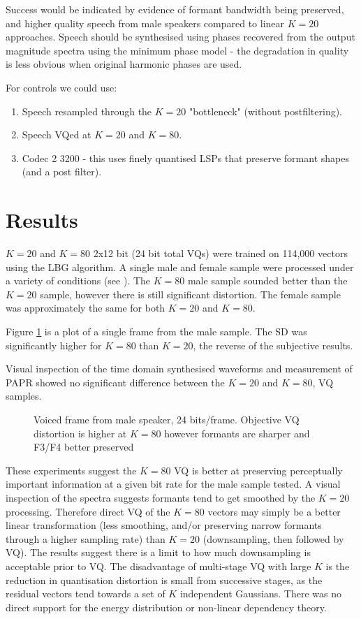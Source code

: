 \documentclass{article}
\begin{document}
Success would be indicated by evidence of formant bandwidth being preserved, and higher quality speech from male speakers compared to linear $K=20$ approaches. Speech should be synthesised using phases recovered from the output magnitude spectra using the minimum phase model - the degradation in quality is less obvious when original harmonic phases are used. 

For controls we could use:
\begin{enumerate}
\item Speech resampled through the $K=20$ "bottleneck" (without postfiltering).
\item Speech VQed at $K=20$ and $K=80$. 
\item Codec 2 3200 - this uses finely quantised LSPs that preserve formant shapes (and a post filter). 
\end{enumerate}

\section{Results}

$K=20$ and $K=80$ 2x12 bit (24 bit total VQs) were trained on 114,000 vectors using the LBG algorithm.  A single male and female sample were processed under a variety of conditions (see ).  The $K=80$ male sample sounded better than the $K=20$ sample, however there is still significant distortion.  The female sample was approximately the same for both $K=20$ and $K=80$.

Figure \ref{fig:big_dog_f61_k20} is a plot of a single frame from the male sample.  The SD was significantly higher for $K=80$ than $K=20$, the reverse of the subjective results.

Visual inspection of the time domain synthesised waveforms and measurement of PAPR showed no significant difference between the $K=20$ and $K=80$, VQ samples.

\begin{figure}
\caption{Voiced frame from male speaker, 24 bits/frame. Objective VQ distortion is higher at $K=80$ however formants are sharper and F3/F4 better preserved}
\label{fig:big_dog_f61_k20}
\begin{center}


\end{center}
\end{figure}

These experiments suggest the $K=80$ VQ is better at preserving perceptually important information at a given bit rate for the male sample tested.  A visual inspection  of the spectra suggests formants tend to get smoothed by the $K=20$ processing.  Therefore direct VQ of the $K=80$ vectors may simply be a better linear transformation (less smoothing, and/or preserving narrow formants through a higher sampling rate) than $K=20$ (downsampling, then followed by VQ). The results suggest there is a limit to how much downsampling is acceptable prior to VQ. The disadvantage of multi-stage VQ with large $K$ is the reduction in quantisation distortion is small from successive stages, as the residual vectors tend towards a set of $K$ independent Gaussians. There was no direct support for the energy distribution or non-linear dependency theory.  
\end{document}
